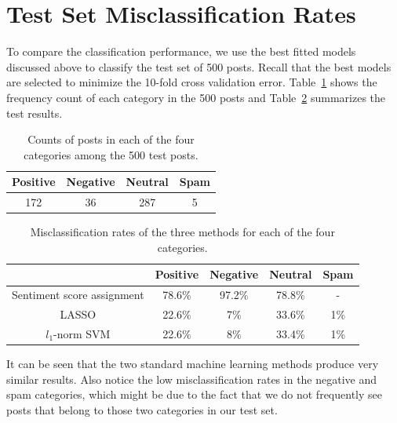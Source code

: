 \documentclass[11pt]{article}
\newcommand{\1}[1]{{\mathbf 1}\left\{#1\right\}}        %
\begin{document}
\clearpage
\section{Test Set Misclassification Rates}

To compare the classification performance, we use the best fitted models discussed above to classify the test set of 500 posts. Recall that the best models are selected to minimize the 10-fold cross validation error. Table~\ref{tb:testcounts} shows the frequency count of each category in the 500 posts and Table~\ref{tb:testmis} summarizes the test results. 

\begin{table}[!h]
\caption{Counts of posts in each of the four categories among the 500 test posts.}
\begin{center}
\begin{tabular}{|c|c|c|c|}
\hline
Positive & Negative & Neutral & Spam \\ \hline
 172      & 36   &   287   &  5 \\ \hline
\end{tabular}
\end{center}
\label{tb:testcounts}
\end{table}%


\begin{table}[!h]
\caption{Misclassification rates of the three methods for each of the four categories.}
\begin{center}
\begin{tabular}{|c|c|c|c|c|}
\hline
              &  			Positive & Negative & Neutral & Spam  \\ \hline
Sentiment score assignment & 	78.6\%		&	97.2\%	&  78.8\%	& -  \\ \hline
LASSO               & 	22.6\%   &   7\%   &   33.6\%    &    1\% \\ \hline
$l_1$-norm SVM       &       22.6\%  &    8\%    &  33.4\%   &     1\% \\ \hline
\end{tabular}
\end{center}
\label{tb:testmis}
\end{table}%



It can be seen that the two standard machine learning methods produce very similar results. Also notice the low misclassification rates in the negative and spam categories, which might be due to the fact that we do not frequently see posts that belong to those two categories in our test set.
\end{document}
